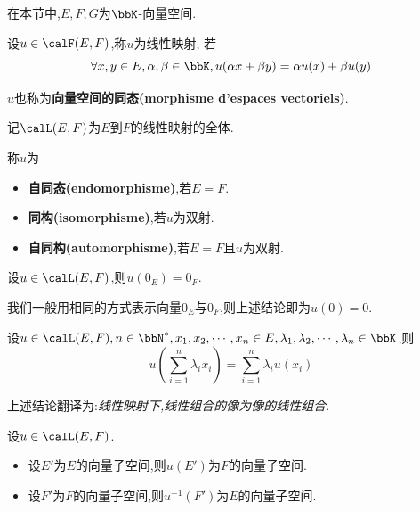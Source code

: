 在本节中,$E, F, G$为$\bbK$-向量空间.

\begin{deff}
    设$u \in \calF(E, F)$,称$u$为线性映射,
    若\[ \forall x, y \in E, \alpha, \beta \in \bbK, u(\alpha x + \beta y) = \alpha u(x) + \beta u(y) \]

    $u$也称为\textbf{向量空间的同态(morphisme d'espaces vectoriels)}.

    记$\calL(E, F)$为$E$到$F$的线性映射的全体.
\end{deff}

\begin{rqq}
    称$u$为
    \begin{itemize}
        \item \textbf{自同态(endomorphisme)},若$E = F$.
        \item \textbf{同构(isomorphisme)},若$u$为双射.
        \item \textbf{自同构(automorphisme)},若$E = F$且$u$为双射.
    \end{itemize}
\end{rqq}

\begin{prop}
    设$u \in \calL(E, F)$,则$u(0_E) = 0_F$.
\end{prop}

\begin{rqq}
    我们一般用相同的方式表示向量$0_E$与$0_F$,则上述结论即为$u(0) = 0$.
\end{rqq}

\begin{rqq}
    设$u \in \calL(E, F), n \in \bbN^*, x_1, x_2, \cdots, x_n \in E, \lambda_1, \lambda_2, \cdots,
    \lambda_n \in \bbK$,则\[ u \left( \sum\limits_{i = 1}^n \lambda_i x_i \right) = \sum\limits_{i = 1}^n
    \lambda_i u(x_i) \]

    上述结论翻译为:\textit{线性映射下,线性组合的像为像的线性组合}.
\end{rqq}

\begin{prop}
    设$u \in \calL(E, F)$.
    \begin{itemize}
        \item 设$E'$为$E$的向量子空间,则$u(E')$为$F$的向量子空间.
        \item 设$F'$为$F$的向量子空间,则$u^{-1}(F')$为$E$的向量子空间.
    \end{itemize}
\end{prop}

